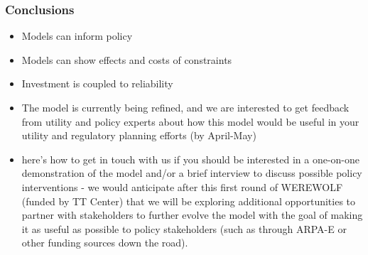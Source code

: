 \documentclass[xcolor=dvipsnames]{beamer}
\begin{document}
\begin{frame}
  \frametitle{Conclusions}
  \begin{itemize}
  \item Models can inform policy
  \item Models can show effects and costs of constraints
  \item Investment is coupled to reliability
      \item The model is currently being refined, and we are interested to get feedback from utility and policy experts about how this model would be useful in your utility and regulatory planning efforts (by April-May)
  \item  here's how to get in touch with us if you should be interested in a one-on-one demonstration of the model and/or a brief interview to discuss possible policy interventions - we would anticipate after this first round of WEREWOLF (funded by TT Center) that we will be exploring additional opportunities to partner with stakeholders to further evolve the model with the goal of making it as useful as possible to policy stakeholders (such as through ARPA-E or other funding sources down the road).
  \end{itemize}
\end{frame}
%
%
%
%
%
\end{document}
